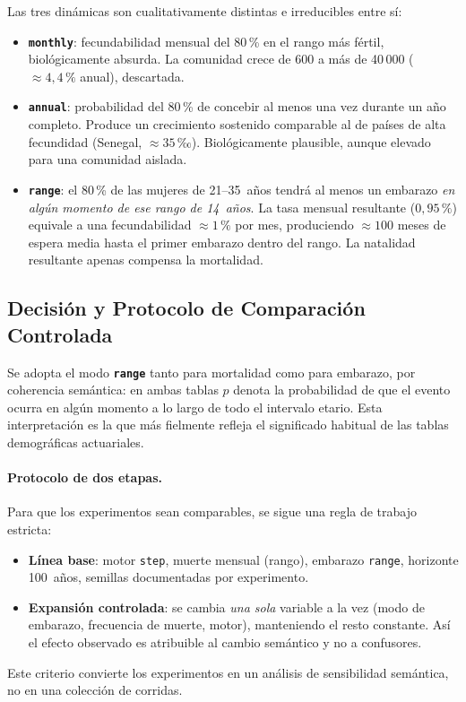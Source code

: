 \documentclass{llncs}
\begin{document}
Las tres dinámicas son cualitativamente distintas e irreducibles entre sí:

\begin{itemize}
  \item \textbf{\texttt{monthly}}: fecundabilidad mensual del 80\,\% en el
        rango más fértil, biológicamente absurda.
        La comunidad crece de 600 a más de 40\,000 ($\approx 4{,}4\,\%$
        anual), descartada.

  \item \textbf{\texttt{annual}}: probabilidad del 80\,\% de concebir al
        menos una vez durante un año completo.
        Produce un crecimiento sostenido comparable al de países de alta
        fecundidad (Senegal, $\approx 35$\,‰).
        Biológicamente plausible, aunque elevado para una comunidad aislada.

  \item \textbf{\texttt{range}}: el 80\,\% de las mujeres de 21--35~años
        tendrá al menos un embarazo \emph{en algún momento de ese rango de
        14~años}.
        La tasa mensual resultante ($0{,}95\,\%$) equivale a una
        fecundabilidad $\approx 1\,\%$ por mes, produciendo
        $\approx 100$ meses de espera media hasta el primer embarazo
        dentro del rango.
        La natalidad resultante apenas compensa la mortalidad.
\end{itemize}

\subsection{Decisión y Protocolo de Comparación Controlada}

Se adopta el modo \textbf{\texttt{range}} tanto para mortalidad como para
embarazo, por coherencia semántica: en ambas tablas $p$ denota la
probabilidad de que el evento ocurra en algún momento a lo largo de todo
el intervalo etario.
Esta interpretación es la que más fielmente refleja el significado habitual
de las tablas demográficas actuariales.

\paragraph{Protocolo de dos etapas.}
Para que los experimentos sean comparables, se sigue una regla de trabajo
estricta:
\begin{itemize}
  \item \textbf{Línea base}: motor \texttt{step}, muerte mensual (rango),
        embarazo \texttt{range}, horizonte 100~años, semillas documentadas
        por experimento.
  \item \textbf{Expansión controlada}: se cambia \emph{una sola} variable
        a la vez (modo de embarazo, frecuencia de muerte, motor), manteniendo
        el resto constante.
        Así el efecto observado es atribuible al cambio semántico y no a
        confusores.
\end{itemize}
Este criterio convierte los experimentos en un análisis de sensibilidad
semántica, no en una colección de corridas.
\end{document}
